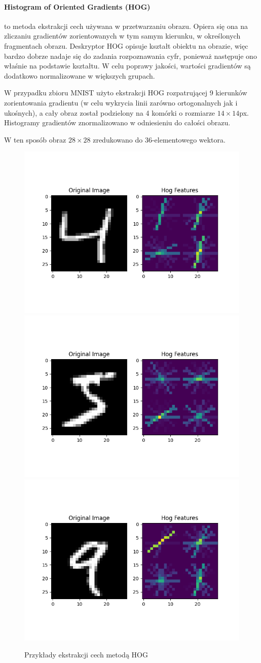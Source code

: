 \documentclass[10pt]{article}
\begin{document}
\paragraph{Histogram of Oriented Gradients (HOG)} to metoda ekstrakcji cech używana w przetwarzaniu obrazu.
Opiera się ona na zliczaniu gradientów zorientowanych w tym samym kierunku, w określonych fragmentach obrazu.
Deskryptor HOG opisuje kształt obiektu na obrazie, więc bardzo dobrze nadaje się do zadania rozpoznawania cyfr, ponieważ następuje ono właśnie na podstawie kształtu.
W celu poprawy jakości, wartości gradientów są dodatkowo normalizowane w większych grupach.

W przypadku zbioru MNIST użyto ekstrakcji HOG rozpatrującej 9 kierunków zorientowania gradientu (w celu wykrycia linii zarówno ortogonalnych jak i ukośnych), 
a cały obraz został podzielony na 4 komórki o rozmiarze $14\times14$px. Histogramy gradientów znormalizowano w odniesieniu do całości obrazu.

W ten sposób obraz $28\times28$ zredukowano do 36-elementowego wektora.

\begin{figure}[H]\centering
    \includegraphics[width=.3\linewidth]{img/hog_vis/4.png}
    \includegraphics[width=.3\linewidth]{img/hog_vis/5.png}
    \includegraphics[width=.3\linewidth]{img/hog_vis/9.png}
    \caption{Przykłady ekstrakcji cech metodą HOG}
\end{figure}
\end{document}
